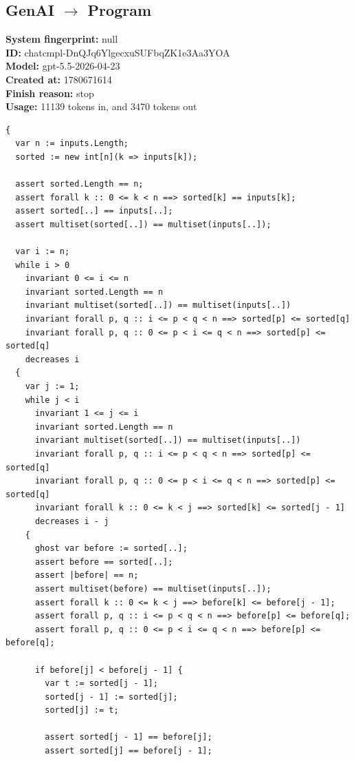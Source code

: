 \documentclass{article}
\begin{document}
\subsection*{GenAI $\rightarrow$ Program}
\textbf{System fingerprint: }null
\\\textbf{ID: }chatcmpl-DnQJq6YlgecxuSUFbqZK1e3Aa3YOA
\\\textbf{Model: }gpt-5.5-2026-04-23
\\\textbf{Created at: }1780671614
\\\textbf{Finish reason: }stop
\\\textbf{Usage: }11139 tokens in, and 3470 tokens out
\begin{lstlisting}
{
  var n := inputs.Length;
  sorted := new int[n](k => inputs[k]);

  assert sorted.Length == n;
  assert forall k :: 0 <= k < n ==> sorted[k] == inputs[k];
  assert sorted[..] == inputs[..];
  assert multiset(sorted[..]) == multiset(inputs[..]);

  var i := n;
  while i > 0
    invariant 0 <= i <= n
    invariant sorted.Length == n
    invariant multiset(sorted[..]) == multiset(inputs[..])
    invariant forall p, q :: i <= p < q < n ==> sorted[p] <= sorted[q]
    invariant forall p, q :: 0 <= p < i <= q < n ==> sorted[p] <= sorted[q]
    decreases i
  {
    var j := 1;
    while j < i
      invariant 1 <= j <= i
      invariant sorted.Length == n
      invariant multiset(sorted[..]) == multiset(inputs[..])
      invariant forall p, q :: i <= p < q < n ==> sorted[p] <= sorted[q]
      invariant forall p, q :: 0 <= p < i <= q < n ==> sorted[p] <= sorted[q]
      invariant forall k :: 0 <= k < j ==> sorted[k] <= sorted[j - 1]
      decreases i - j
    {
      ghost var before := sorted[..];
      assert before == sorted[..];
      assert |before| == n;
      assert multiset(before) == multiset(inputs[..]);
      assert forall k :: 0 <= k < j ==> before[k] <= before[j - 1];
      assert forall p, q :: i <= p < q < n ==> before[p] <= before[q];
      assert forall p, q :: 0 <= p < i <= q < n ==> before[p] <= before[q];

      if before[j] < before[j - 1] {
        var t := sorted[j - 1];
        sorted[j - 1] := sorted[j];
        sorted[j] := t;

        assert sorted[j - 1] == before[j];
        assert sorted[j] == before[j - 1];


\end{lstlisting}
\end{document}
